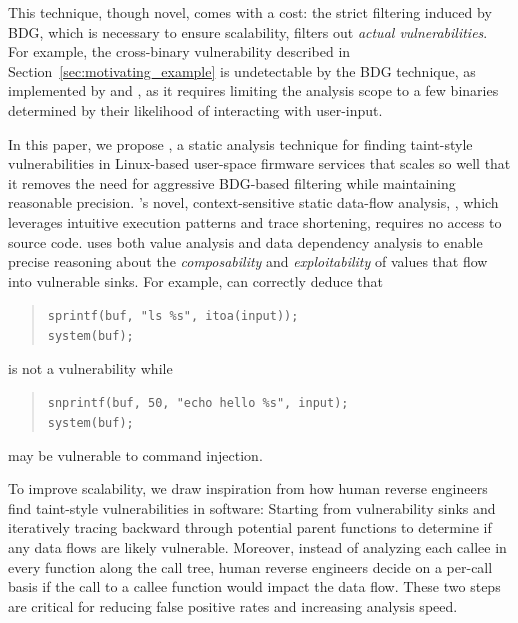 This technique, though novel, comes with a cost: the strict filtering induced by BDG, which is necessary to ensure scalability, filters out \emph{actual vulnerabilities}.
For example, the cross-binary vulnerability described in Section~\ref{sec:motivating_example} is undetectable by the BDG technique, as implemented by \karonte and \satc, as it requires limiting the analysis scope to a few binaries determined by their likelihood of interacting with user-input.

\smallskip

In this paper, we propose \mango, a static analysis technique for finding taint-style vulnerabilities in Linux-based user-space firmware services that scales so well that it removes the need for aggressive BDG-based filtering while maintaining reasonable precision.
\mango's novel, context-sensitive static data-flow analysis, \rda, which leverages intuitive execution patterns and trace shortening, requires no access to source code.
\rda uses both value analysis and data dependency analysis to enable precise reasoning about the \emph{composability} and \emph{exploitability} of values that flow into vulnerable sinks.
For example, \rda can correctly deduce that

\begin{quote}
    \small
    \texttt{sprintf(buf, "ls \%s", itoa(input));} \\
    \texttt{system(buf);}
\end{quote}

\noindent
is not a vulnerability while

\begin{quote}
    \small
    \texttt{snprintf(buf, 50, "echo hello \%s", input);} \\
    \texttt{system(buf);}
\end{quote}

\noindent
may be vulnerable to command injection.

To improve scalability, we draw inspiration from how human reverse engineers find taint-style vulnerabilities in software:
Starting from vulnerability sinks and iteratively tracing backward through potential parent functions to determine if any data flows are likely vulnerable.
Moreover, instead of analyzing each callee in every function along the call tree, human reverse engineers decide on a per-call basis if the call to a callee function would impact the data flow.
These two steps are critical for reducing false positive rates and increasing analysis speed.

